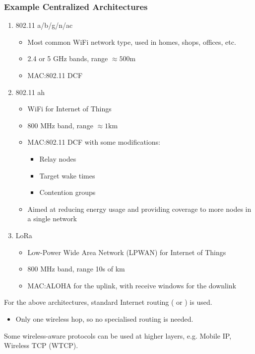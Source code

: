 \subsubsection{Example Centralized Architectures}\label{subsubsec:Example_Centralized_Architectures}
\begin{enumerate}[noitemsep]
\item 802.11 a/b/g/n/ac
\begin{itemize}[noitemsep]
\item Most common WiFi network type, used in homes, shops, offices, etc.
\item 2.4 or 5 GHz bands, range $\approx 500 \si{\meter}$
\item MAC:\@ 802.11 DCF
\end{itemize}

\item 802.11 ah
  \begin{itemize}[noitemsep]
  \item WiFi for Internet of Things
  \item 800 MHz band, range $\approx 1 \si{\kilo \meter}$
  \item MAC:\@ 802.11 DCF with some modifications:
    \begin{itemize}[noitemsep]
    \item Relay nodes
    \item Target wake times
    \item Contention groups
    \end{itemize}
  \item Aimed at reducing energy usage and providing coverage to more nodes in a single network
\end{itemize}

\item LoRa
  \begin{itemize}[noitemsep]
  \item Low-Power Wide Area Network (LPWAN) for Internet of Things
  \item 800 MHz band, range 10s of km
  \item MAC:\@ ALOHA for the uplink, with receive windows for the downlink
  \end{itemize}
\end{enumerate}

\begin{remark*}
  For the above architectures, standard Internet routing ( or ) is used.
  \begin{itemize}[noitemsep]
  \item Only one wireless hop, so no specialised routing is needed.
  \end{itemize}
\end{remark*}

\begin{remark*}
  Some wireless-aware protocols can be used at higher layers, e.g. Mobile IP, Wireless TCP (WTCP).
\end{remark*}

